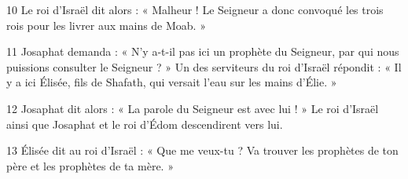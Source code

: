 
10 Le roi d’Israël dit alors : « Malheur ! Le Seigneur a donc convoqué les trois rois pour les livrer aux mains de Moab. »

11 Josaphat demanda : « N’y a-t-il pas ici un prophète du Seigneur, par qui nous puissions consulter le Seigneur ? » Un des serviteurs du roi d’Israël répondit : « Il y a ici Élisée, fils de Shafath, qui versait l’eau sur les mains d’Élie. »

12 Josaphat dit alors : « La parole du Seigneur est avec lui ! » Le roi d’Israël ainsi que Josaphat et le roi d’Édom descendirent vers lui.

13 Élisée dit au roi d’Israël : « Que me veux-tu ? Va trouver les prophètes de ton père et les prophètes de ta mère. »